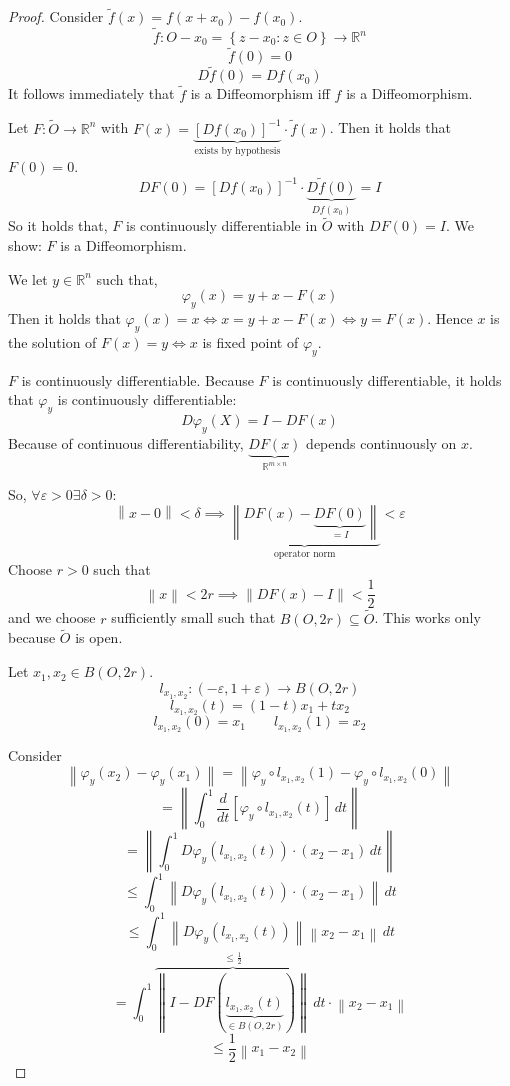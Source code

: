\documentclass[a4paper,landscape,twocolumn]{article}
\theoremstyle{definition}
\newcommand\set[1]{\left\{#1\right\}}
\newcommand\norm[1]{\left\|#1\right\|}
\begin{document}
\begin{proof}
  Consider $\tilde{f}(x) = f(x + x_0) - f(x_0)$.
  \[ \tilde{f}: O - x_0 = \set{z - x_0: z \in O} \to \mathbb R^n \]
  \[ \tilde{f}(0) = 0 \]
  \[ D\tilde{f}(0) = Df(x_0) \]
  It follows immediately that $\tilde{f}$ is a Diffeomorphism iff $f$ is a Diffeomorphism.

  Let $F: \tilde{O} \to \mathbb R^n$ with $F(x) = \underbrace{[Df(x_0)]^{-1}}_{\text{exists by hypothesis}} \cdot \tilde{f}(x)$. Then it holds that $F(0) = 0$.
  \[ DF(0) = [Df(x_0)]^{-1} \cdot \underbrace{D\tilde{f}(0)}_{Df(x_0)} = I \]
  So it holds that, $F$ is continuously differentiable in $\tilde{O}$ with $DF(0) = I$. We show: $F$ is a Diffeomorphism.

  We let $y \in \mathbb R^n$ such that,
  \[ \varphi_y(x) = y + x - F(x) \]
  Then it holds that $\varphi_y(x) = x \iff x = y + x - F(x) \iff y = F(x)$.
  Hence $x$ is the solution of $F(x) = y \iff x$ is fixed point of $\varphi_y$.

  $F$ is continuously differentiable.
  Because $F$ is continuously differentiable, it holds that $\varphi_y$ is continuously differentiable:
  \[ D\varphi_y(X) = I - DF(x) \]
  Because of continuous differentiability, $\underbrace{DF(x)}_{\mathbb R^{m\times n}}$ depends continuously on $x$.

  So, $\forall \varepsilon > 0 \exists \delta > 0:$
  \[ \norm{x - 0} < \delta \implies \underbrace{\norm{DF(x) - \underbrace{DF(0)}_{=I}}}_{\text{operator norm}} < \varepsilon \]
  Choose $r > 0$ such that
  \[ \norm{x} < 2r \implies \norm{DF(x) - I} < \frac12 \]
  and we choose $r$ sufficiently small such that $B(O,2r) \subseteq \tilde{O}$. This works only because $\tilde{O}$ is open.

  Let $x_1, x_2 \in B(O, 2r)$.
  \[ l_{x_1,x_2}: (-\varepsilon, 1 + \varepsilon) \to B(O, 2r) \]
  \[ l_{x_1,x_2}(t) = (1 - t) x_1 + t x_2 \]
  \[ l_{x_1,x_2}(0) = x_1 \qquad l_{x_1,x_2}(1) = x_2 \]

  Consider
  \[ \norm{\varphi_y(x_2) - \varphi_y(x_1)} = \norm{\varphi_y \circ l_{x_1,x_2}(1) - \varphi_y \circ l_{x_1,x_2}(0)} \]
  \[ = \norm{\int_0^1 \frac{d}{dt} [\varphi_y \circ l_{x_1,x_2}(t)] \, dt} \]
  \[ = \norm{\int_0^1 D\varphi_y(l_{x_1,x_2}(t)) \cdot (x_2 - x_1) \, dt} \]
  \[ \leq \int_0^1 \norm{D\varphi_y(l_{x_1,x_2}(t)) \cdot (x_2 - x_1)} \, dt \]
  \[ \leq \int_0^1 \norm{D\varphi_y(l_{x_1,x_2}(t))} \norm{x_2 - x_1} \, dt \]
  \[ = \int_0^1 \overbrace{\norm{I - DF(\underbrace{l_{x_1,x_2}(t)}_{\in B(O,2r)})}}^{\leq \frac12} \, dt \cdot \norm{x_2 - x_1} \]
  \[ \leq \frac12 \norm{x_1 - x_2} \]


\end{proof}
\end{document}

